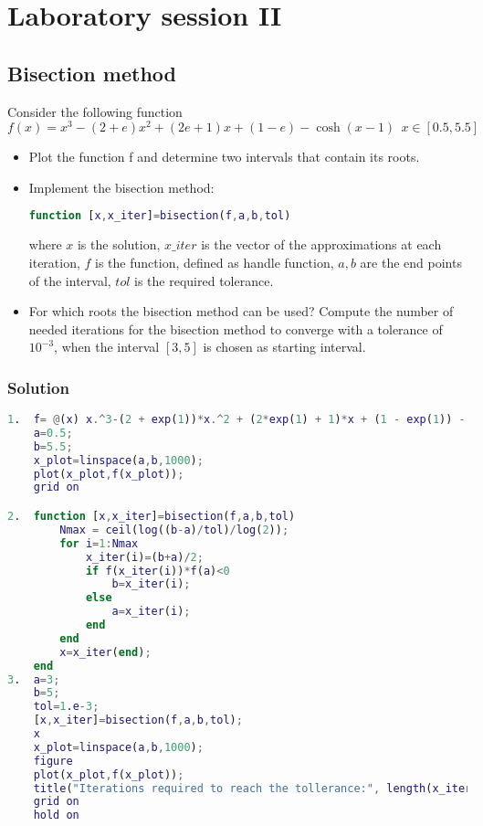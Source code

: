 \documentclass[12pt, a4paper]{report}
\newtheorem[style=M,bodystyle=\normalfont]{theorem}{Theorem}
\newtheorem[style=M,bodystyle=\normalfont]{corollary}{Corollary}
\newtheorem[style=M,bodystyle=\normalfont]{lemma}{Lemma}
\newtheorem[style=M,bodystyle=\normalfont]{definition}{Definition}
\begin{document}
\newpage

\chapter{Laboratory session II}
    \section{Bisection method}
        Consider the following function
        \[f(x) = x^3-(2+e)x^2+(2e+1)x+(1-e)-\cosh(x-1) \:\: x \in [0.5, 5.5]\]
        \begin{itemize}
            \item Plot the function f and determine two intervals that contain its roots.
            \item Implement the bisection method:
                \begin{lstlisting}[language=Matlab]
function [x,x_iter]=bisection(f,a,b,tol)
                \end{lstlisting}
                where $x$ is the solution, $x\_iter$ is the vector of the approximations at each iteration, $f$ is the function, defined as handle function, $a,b$ are the end points 
                of the interval, $tol$ is the required tolerance.
            \item For which roots the bisection method can be used? Compute the number of needed iterations for the bisection method to converge with a tolerance of $10^{-3}$, 
                when the interval $[3, 5]$ is chosen as starting interval.
        \end{itemize}
    \subsection*{Solution}
        \begin{lstlisting}[language=Matlab]
1.  f= @(x) x.^3-(2 + exp(1))*x.^2 + (2*exp(1) + 1)*x + (1 - exp(1)) - cosh(x - 1);
    a=0.5;
    b=5.5;
    x_plot=linspace(a,b,1000);
    plot(x_plot,f(x_plot));
    grid on

2.  function [x,x_iter]=bisection(f,a,b,tol)
        Nmax = ceil(log((b-a)/tol)/log(2));
        for i=1:Nmax
            x_iter(i)=(b+a)/2;
            if f(x_iter(i))*f(a)<0
                b=x_iter(i);
            else
                a=x_iter(i);
            end
        end
        x=x_iter(end);
    end
3.  a=3;
    b=5;
    tol=1.e-3;
    [x,x_iter]=bisection(f,a,b,tol);
    x
    x_plot=linspace(a,b,1000);
    figure
    plot(x_plot,f(x_plot));
    title("Iterations required to reach the tollerance:", length(x_iter))
    grid on
    hold on
        \end{lstlisting}  
\end{document}
